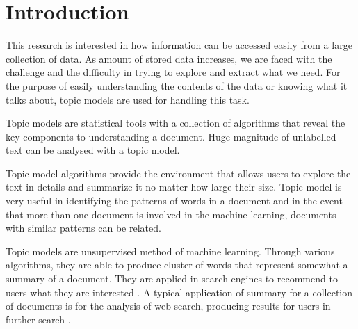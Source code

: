 \chapter{Introduction}

%
%
%

This research is interested in how information can be accessed easily from a large collection of data. As amount of stored data increases, we are faced with the challenge and the difficulty in trying to explore and extract what we need. For the purpose of easily understanding the contents of the data or knowing what it talks about, topic models are used for  handling this task.

Topic models are statistical tools with a collection of algorithms that reveal the key components to understanding a document. Huge magnitude of unlabelled text can be analysed with a topic model.

Topic model algorithms provide the environment that allows   users to explore the text in details and summarize it no matter how large their size. Topic model is very useful in identifying the patterns of words in a document and in the event that more than one document is involved in the machine learning, documents with similar patterns can be related. 

Topic models are unsupervised method of machine learning. Through various algorithms, they are able to produce cluster of words that represent somewhat a summary of a document. They are applied in search engines to recommend to users what they are interested . A typical application of summary for a collection of documents is for the analysis of web search, producing results for users in further search \citep{turpin2007fast} . %


